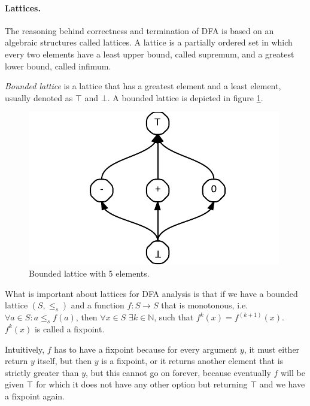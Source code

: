         \paragraph*{Lattices.}
        The reasoning behind correctness and termination of DFA 
        is based on an algebraic structures called lattices. 
        A lattice is a partially ordered set in which every 
        two elements have a least upper bound, called supremum, 
        and a greatest lower bound, called infimum.
        
        \emph{Bounded lattice} is a lattice that has 
        a greatest element and a least element, 
        usually denoted as $\top$ and $\bot$. 
        A bounded lattice is depicted in figure \ref{lattice}.       
        
\begin{figure}[h]  
  \centering
    \includegraphics{img/lattice.pdf}
  \caption{Bounded lattice with 5 elements.\label{lattice}}    
\end{figure}

        What is important about lattices for 
        DFA analysis is that if we have a 
        bounded lattice $(S, \leq_{s})$ and a function 
        $f:S\rightarrow{S}$ that is monotonous, 
        i.e. $\forall{a\in{S}}: a\leq_s{f(a)}$, then 
        $\forall{x\in{S}}$ $\exists{k\in\mathbb{N}}$, such that 
        $f^k(x)=f^{(k+1)}(x)$. $f^k(x)$ is called a fixpoint.
        
        Intuitively, $f$ has to have a fixpoint because 
        for every argument $y$, it must either return 
        $y$ itself, but then $y$ is a fixpoint, or it 
        returns another element that is strictly 
        greater than $y$, 
        but this cannot go on forever, because eventually 
        $f$ will be given $\top$ for which it does not have 
        any other option but returning $\top$ and we 
        have a fixpoint again.
        
